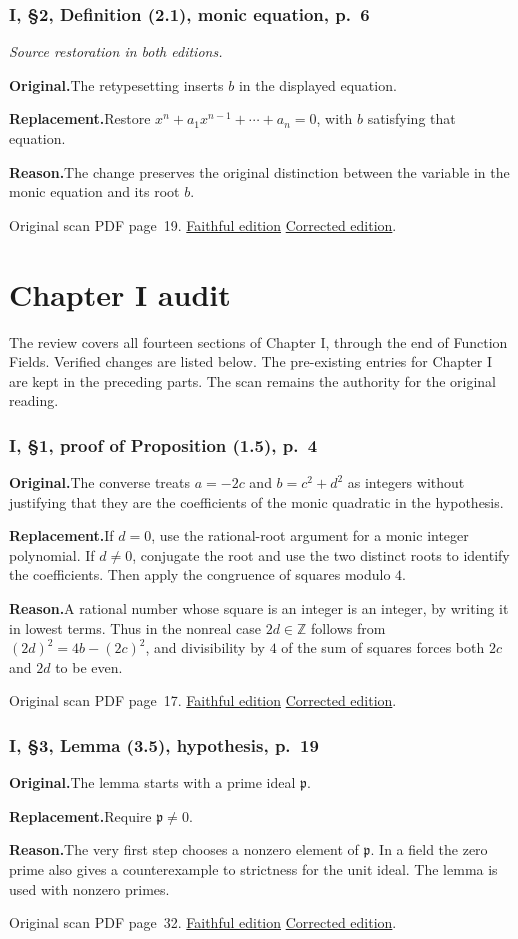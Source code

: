 \documentclass[11pt,a4paper]{article}
\newcommand{\original}{\par\smallskip\noindent\textbf{Original.}\enspace}
\newcommand{\replacement}{\par\smallskip\noindent\textbf{Replacement.}\enspace}
\newcommand{\reason}{\par\smallskip\noindent\textbf{Reason.}\enspace}
\newcommand{\editionlink}[3]{\href{#1\#errata.#2}{#3}}
\newcommand{\location}[2]{%
  \par\smallskip\noindent Original scan PDF page~#2.\enspace
  \editionlink{Neukirch_Faithful.pdf}{#1}{Faithful edition}
  \quad\editionlink{Neukirch_Corrected.pdf}{#1}{Corrected edition}.}
\begin{document}
\setcounter{section}{43}
\section{I, \S2, Definition (2.1), monic equation, p.~6}\label{errata:item:44}
\noindent\emph{Source restoration in both editions.}\par
\original The retypesetting inserts $b$ in the displayed equation.
\replacement Restore $x^n+a_1x^{n-1}+\cdots+a_n=0$, with $b$ satisfying that equation.
\reason The change preserves the original distinction between the variable in the monic equation and its root $b$.
\location{44}{19}


\clearpage
\clearpage
\part{Chapter I audit}
The review covers all fourteen sections of Chapter I, through the end of Function Fields. Verified changes are listed below. The pre-existing entries for Chapter I are kept in the preceding parts. The scan remains the authority for the original reading.
\setcounter{section}{44}
\section{I, \S1, proof of Proposition (1.5), p.~4}\label{errata:item:45}

\original The converse treats $a=-2c$ and $b=c^2+d^2$ as integers without justifying that they are the coefficients of the monic quadratic in the hypothesis.
\replacement If $d=0$, use the rational-root argument for a monic integer polynomial. If $d\ne0$, conjugate the root and use the two distinct roots to identify the coefficients. Then apply the congruence of squares modulo $4$.
\reason A rational number whose square is an integer is an integer, by writing it in lowest terms. Thus in the nonreal case $2d\in\mathbb Z$ follows from $(2d)^2=4b-(2c)^2$, and divisibility by $4$ of the sum of squares forces both $2c$ and $2d$ to be even.
\location{45}{17}

\setcounter{section}{45}
\section{I, \S3, Lemma (3.5), hypothesis, p.~19}\label{errata:item:46}

\original The lemma starts with a prime ideal $\mathfrak p$.
\replacement Require $\mathfrak p\ne0$.
\reason The very first step chooses a nonzero element of $\mathfrak p$. In a field the zero prime also gives a counterexample to strictness for the unit ideal. The lemma is used with nonzero primes.
\location{46}{32}
\end{document}

